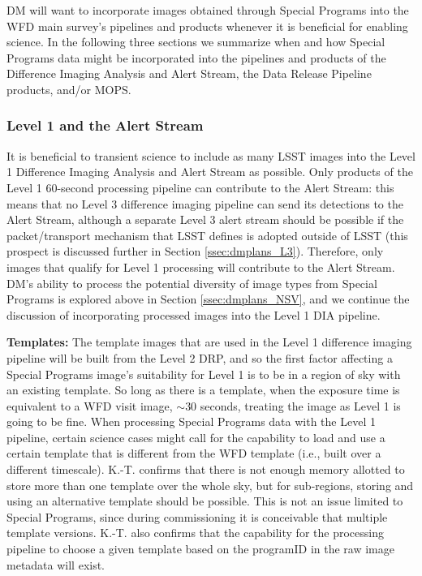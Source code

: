 \documentclass[DM,lsstdraft,toc]{lsstdoc}
\begin{document}
DM will want to incorporate images obtained through Special Programs into the WFD main survey's pipelines and products whenever it is beneficial for enabling science. In the following three sections we summarize when and how Special Programs data might be incorporated into the pipelines and products of the Difference Imaging Analysis and Alert Stream, the Data Release Pipeline products, and/or MOPS.

\subsubsection{Level 1 and the Alert Stream}\label{ssec:dmplans_WFD_L1}

It is beneficial to transient science to include as many LSST images into the Level 1 Difference Imaging Analysis and Alert Stream as possible. Only products of the Level 1 $60$-second processing pipeline can contribute to the Alert Stream: this means that no Level 3 difference imaging pipeline can send its detections to the Alert Stream, although a separate Level 3 alert stream should be possible if the packet/transport mechanism that LSST defines is adopted outside of LSST (this prospect is discussed further in Section \ref{ssec:dmplans_L3}). Therefore, only images that qualify for Level 1 processing will contribute to the Alert Stream. DM's ability to process the potential diversity of image types from Special Programs is explored above in Section \ref{ssec:dmplans_NSV}, and we continue the discussion of incorporating processed images into the Level 1 DIA pipeline.

\textbf{Templates:} The template images that are used in the Level 1 difference imaging pipeline will be built from the Level 2 DRP, and so the first factor affecting a Special Programs image's suitability for Level 1 is to be in a region of sky with an existing template. So long as there is a template, when the exposure time is equivalent to a WFD visit image, $\sim 30$ seconds, treating the image as Level 1 is going to be fine. When processing Special Programs data with the Level 1 pipeline, certain science cases might call for the capability to load and use a certain template that is different from the WFD template (i.e., built over a different timescale). K.-T. confirms that there is not enough memory allotted to store more than one template over the whole sky, but for sub-regions, storing and using an alternative template should be possible. This is not an issue limited to Special Programs, since during commissioning it is conceivable that multiple template versions. K.-T. also confirms that the capability for the processing pipeline to choose a given template based on the programID in the raw image metadata will exist.
\end{document}
